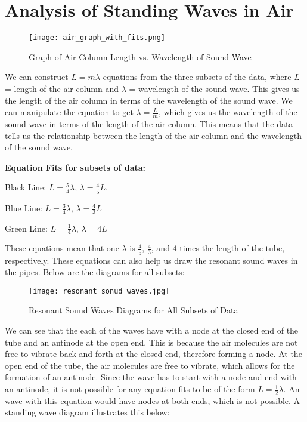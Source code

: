 \documentclass[11pt,twoside]{article}
\begin{document}

\section{Analysis of Standing Waves in Air}

\begin{figure}[H]
    \centering
    \texttt{[image: air\_graph\_with\_fits.png]}
    \caption{Graph of Air Column Length vs. Wavelength of Sound Wave}
\end{figure}

 We can construct $L = m\lambda$ equations from the three subsets of the data, where $L$ = length of the air column and $\lambda$ = wavelength of the sound wave. This gives us the length of the air column in terms of the wavelength of the sound wave. We can manipulate the equation to get $\lambda = \frac{L}{m}$, which gives us the wavelength of the sound wave in terms of the length of the air column. This means that the data tells us the relationship between the length of the air column and the wavelength of the sound wave.
 
\textbf{Equation Fits for subsets of data:}

Black Line: $L =\frac{5}{4}\lambda$, $\lambda = \frac{4}{5}L$. 

Blue Line: $L =\frac{3}{4}\lambda$, $\lambda = \frac{4}{3}L$

Green Line: $L = \frac{1}{4}\lambda$, $\lambda = 4L$

These equations mean that one $\lambda$ is $\frac{4}{5}$, $\frac{4}{3}$, and $4$ times the length of the tube, respectively. These equations can also help us draw the resonant sound waves in the pipes. Below are the diagrams for all subsets:

\begin{figure}[H]
    \centering
    \texttt{[image: resonant\_sonud\_waves.jpg]}
    \caption{Resonant Sound Waves Diagrams for All Subsets of Data}
\end{figure}

We can see that the each of the waves have with a node at the closed end of the tube and an antinode at the open end. This is because the air molecules are not free to vibrate back and forth at the closed end, therefore forming a node. At the open end of the tube, the air molecules are free to vibrate, which allows for the formation of an antinode. Since the wave has to start with a node and end with an antinode, it is not possible for any equation fits to be of the form $L = \frac{1}{2}\lambda$. An wave with this equation would have nodes at both ends, which is not possible. A standing wave diagram illustrates this below:
\end{document}

